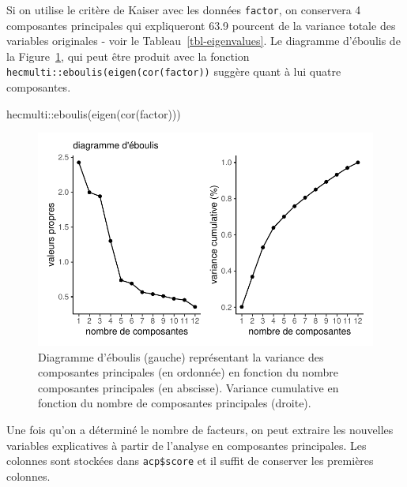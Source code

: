 \documentclass[
  11pt,
  letterpaper,
]{scrbook}
\newenvironment{Shaded}{\begin{snugshade}}{\end{snugshade}}
\newcommand{\FunctionTok}[1]{\textcolor[rgb]{0.28,0.35,0.67}{#1}}
\newcommand{\NormalTok}[1]{\textcolor[rgb]{0.00,0.23,0.31}{#1}}
\newcommand{\SpecialCharTok}[1]{\textcolor[rgb]{0.37,0.37,0.37}{#1}}
\theoremstyle{definition}
\theoremstyle{remark}
\begin{document}
Si on utilise le critère de Kaiser avec les données \texttt{factor}, on
conservera 4 composantes principales qui expliqueront 63.9 pourcent de
la variance totale des variables originales - voir le
Tableau~\ref{tbl-eigenvalues}. Le diagramme d'éboulis de la
Figure~\ref{fig-screeplot}, qui peut être produit avec la fonction
\texttt{hecmulti::eboulis(eigen(cor(factor))} suggère quant à lui quatre
composantes.

\begin{Shaded}
\begin{Highlighting}[]
\NormalTok{hecmulti}\SpecialCharTok{::}\FunctionTok{eboulis}\NormalTok{(}\FunctionTok{eigen}\NormalTok{(}\FunctionTok{cor}\NormalTok{(factor)))}
\end{Highlighting}
\end{Shaded}

\begin{figure}[ht!]

{\centering \includegraphics{analysefactorielle_files/figure-pdf/fig-screeplot-1.pdf}

}

\caption{\label{fig-screeplot}Diagramme d'éboulis (gauche) représentant
la variance des composantes principales (en ordonnée) en fonction du
nombre composantes principales (en abscisse). Variance cumulative en
fonction du nombre de composantes principales (droite).}

\end{figure}

Une fois qu'on a déterminé le nombre de facteurs, on peut extraire les
nouvelles variables explicatives à partir de l'analyse en composantes
principales. Les colonnes sont stockées dans \texttt{acp\$score} et il
suffit de conserver les premières colonnes.
\end{document}
